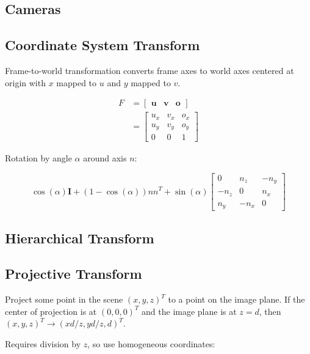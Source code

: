 \documentclass[10pt,landscape]{article}
\newcommand{\identity}{\mathbf{I}}
\begin{document}
\begin{multicols}{3}
\section{Cameras}




\subsection{Coordinate System Transform}

Frame-to-world transformation converts frame axes to world axes centered at origin with $x$ mapped to $u$ and $y$ mapped to $v$.

\begin{align*}
    F &= \begin{bmatrix}
        \textbf{u} & \textbf{v} & \textbf{o}
    \end{bmatrix} \\
    &= \begin{bmatrix}
        u_x & v_x & o_x \\
        u_y & v_y & o_y \\
        0 & 0 & 1
    \end{bmatrix}
\end{align*}

Rotation by angle $\alpha$ around axis $n$:

$$\cos(\alpha)\identity + (1 - \cos(\alpha))nn^T + \sin(\alpha)\begin{bmatrix}
    0 & n_z & -n_y \\
    -n_z & 0 & n_x \\
    n_y & -n_x & 0
\end{bmatrix}$$

\subsection{Hierarchical Transform}

\subsection{Projective Transform}

Project some point in the scene $(x, y, z)^T$ to a point on the image plane. If the center of projection is at $(0, 0, 0)^T$ and the image plane is at $z = d$, then $(x, y, z)^T \rightarrow (xd/z, yd/z, d)^T$.

Requires division by $z$, so use homogeneous coordinates:


\end{multicols}
\end{document}
